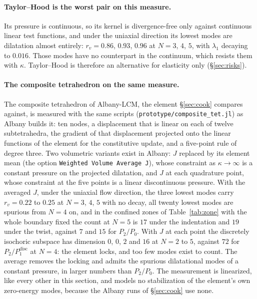 \documentclass[11pt]{article}
\newcommand{\code}[1]{\texttt{#1}}
\theoremstyle{definition}
\theoremstyle{plain}
\begin{document}
\paragraph{Taylor--Hood is the worst pair on this measure.} Its pressure is
continuous, so its kernel is divergence-free only against continuous linear
test functions, and under the uniaxial direction its lowest modes are
dilatation almost entirely: $r_v = 0.86$, $0.93$, $0.96$ at $N = 3$, $4$, $5$,
with $\lambda_1$ decaying to $0.016$. Those modes have no counterpart in the
continuum, which resists them with $\kappa$. Taylor--Hood is therefore an
alternative for elasticity only (\S\ref{sec:risks}).

\paragraph{The composite tetrahedron on the same measure.} The composite
tetrahedron of Albany-LCM, the element \S\ref{sec:cook} compares against,
is measured with the same scripts (\code{prototype/composite\_tet.jl}) as
Albany builds it: ten nodes, a displacement that is linear on each of
twelve subtetrahedra, the gradient of that displacement projected onto the
linear functions of the element for the constitutive update, and a
five-point rule of degree three. Two volumetric variants exist in Albany:
$J$ replaced by its element mean (the option \code{Weighted Volume Average J}),
whose constraint as $\kappa \to \infty$ is a constant pressure on the
projected dilatation, and $J$ at each quadrature point, whose constraint at
the five points is a linear discontinuous pressure. With the averaged $J$,
under the uniaxial flow direction, the three lowest modes carry $r_v = 0.22$
to $0.25$ at $N = 3$, $4$, $5$ with no decay, all twenty lowest modes are
spurious from $N = 4$ on, and in the confined zones of Table~\ref{tab:zone}
with the whole boundary fixed the count at $N = 5$ is $17$ under the
indentation and $19$ under the twist, against $7$ and $15$ for $P_2/P_0$.
With $J$ at each point the discretely isochoric subspace has dimension $0$,
$0$, $2$ and $16$ at $N = 2$ to $5$, against $72$ for $P_2/P_1^{\mathrm{disc}}$
at $N = 4$: the element locks, and too few modes exist to count. The
average removes the locking and admits the spurious dilatational modes of a
constant pressure, in larger numbers than $P_2/P_0$. The measurement is
linearized, like every other in this section, and models no stabilization
of the element's own zero-energy modes, because the Albany runs of
\S\ref{sec:cook} use none.
\end{document}

